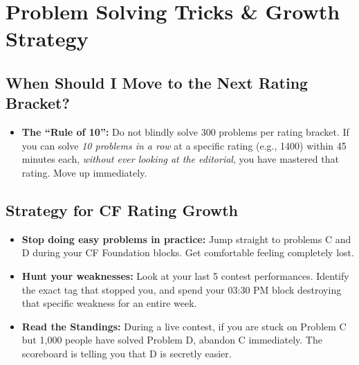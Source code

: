 \documentclass[12pt, a4paper]{article}
\begin{document}
\section{Problem Solving Tricks \& Growth Strategy}

\subsection*{When Should I Move to the Next Rating Bracket?}

\begin{itemize}[leftmargin=2em, itemsep=4pt]
  \item \textbf{The ``Rule of 10'':} Do not blindly solve 300 problems per
        rating bracket. If you can solve \emph{10 problems in a row} at a
        specific rating (e.g., 1400) within 45 minutes each, \emph{without
        ever looking at the editorial}, you have mastered that rating.
        Move up immediately.
\end{itemize}

\subsection*{Strategy for CF Rating Growth}

\begin{itemize}[leftmargin=2em, itemsep=6pt]

  \item \textbf{Stop doing easy problems in practice:} Jump straight to
        problems C and D during your CF Foundation blocks. Get comfortable
        feeling completely lost.

  \item \textbf{Hunt your weaknesses:} Look at your last 5 contest
        performances. Identify the exact tag that stopped you, and spend your
        03:30 PM block destroying that specific weakness for an entire week.

  \item \textbf{Read the Standings:} During a live contest, if you are stuck
        on Problem C but 1{,}000 people have solved Problem D, abandon C
        immediately. The scoreboard is telling you that D is secretly easier.

\end{itemize}
\end{document}

